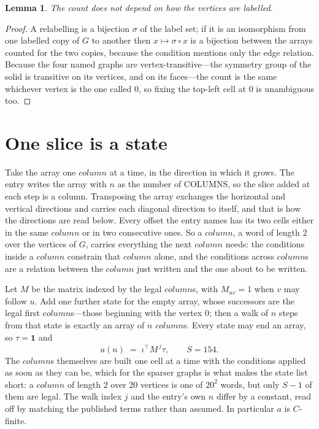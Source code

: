 \documentclass[11pt,a4paper]{article}
\theoremstyle{plain}
\newtheorem{lemma}[theorem]{Lemma}
\theoremstyle{definition}
\begin{document}
\begin{lemma}\label{lem:label}
The count does not depend on how the vertices are labelled.
\end{lemma}

\begin{proof}
A relabelling is a bijection $\sigma$ of the label set; if it is an isomorphism from one
labelled copy of $G$ to another then $x\mapsto\sigma\circ x$ is a bijection between the arrays
counted for the two copies, because the condition mentions only the edge relation.
Because the four named graphs are vertex-transitive---the symmetry group of the solid is transitive on its vertices, and on its faces---the count is the same whichever vertex is the one called $0$, so fixing the top-left cell at $0$ is unambiguous too.
\end{proof}

\section{One slice is a state}

Take the array one $column$ at a time, in the direction in which it grows. The entry writes the array with $n$ as the number of COLUMNS, so the slice added at each step is a column. Transposing the array exchanges the horizontal and vertical directions and carries each diagonal direction to itself, and that is how the directions are read below.
Every offset the entry names has its two cells either in the same $column$ or in two
consecutive ones. So a $column$, a word of length $2$ over the vertices of $G$, carries
everything the next $column$ needs: the conditions inside a $column$ constrain that
$column$ alone, and the conditions across $column$s are a relation between the
$column$ just written and the one about to be written.

Let $M$ be the matrix indexed by the legal $column$s, with $M_{uv}=1$ when $v$ may
follow $u$. Add one further state for the empty array, whose successors are the legal first
$column$s---those beginning with the vertex $0$; then a walk of
$n$ steps from that state is exactly an array of $n$ $column$s. Every state may end an
array, so $\tau=\mathbf{1}$ and
\[
a(n)\;=\;\iota^{\!\top}M^{\,j}\tau ,\qquad S=154.
\]
The $column$s themselves are built one cell at a time with the conditions applied as soon
as they can be, which for the sparser graphs is what makes the state list short: a $column$
of length $2$ over $20$ vertices is one of $20^{2}$ words, but only $S-1$ of them are
legal. The walk index $j$ and the entry's own $n$ differ by a constant, read off by matching the
published terms rather than assumed. In particular $a$ is $C$-finite.
\end{document}
